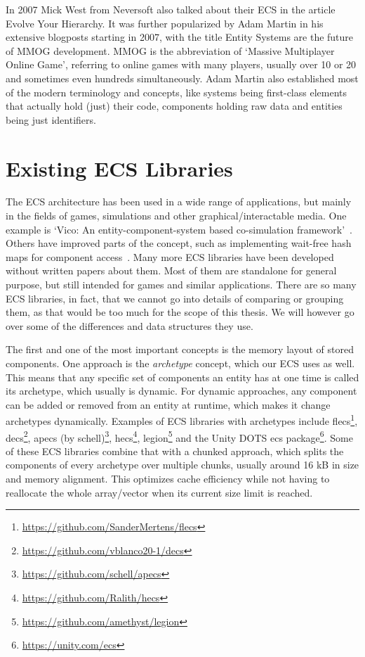 In 2007 Mick West from Neversoft also talked about their ECS in the article \textsf{Evolve Your Hierarchy}\cite{evolvehierarchy}. It was further popularized by Adam Martin in his extensive blogposts starting in 2007, with the title \textsf{Entity Systems are the future of MMOG development}\cite{entitysystems}. MMOG is the abbreviation of `Massive Multiplayer Online Game', referring to online games with many players, usually over 10 or 20 and sometimes even hundreds simultaneously. Adam Martin also established most of the modern terminology and concepts, like systems being first-class elements that actually hold (just) their code, components holding raw data and entities being just identifiers.

\section{Existing ECS Libraries}\label{sec:existingecs}

The ECS architecture has been used in a wide range of applications, but mainly in the fields of games, simulations and other graphical/interactable media. One example is `Vico: An entity-component-system based co-simulation framework'~\cite{hatledal2021vico}. Others have improved parts of the concept, such as implementing wait-free hash maps for component access~\cite{lange2016wait}. Many more ECS libraries have been developed without written papers about them. Most of them are standalone for general purpose, but still intended for games and similar applications. There are so many ECS libraries, in fact, that we cannot go into details of comparing or grouping them, as that would be too much for the scope of this thesis. We will however go over some of the differences and data structures they use.

The first and one of the most important concepts is the memory layout of stored components. One approach is the \textit{archetype} concept, which our ECS uses as well. This means that any specific set of components an entity has at one time is called its archetype, which usually is dynamic. For dynamic approaches, any component can be added or removed from an entity at runtime, which makes it change archetypes dynamically. Examples of ECS libraries with archetypes include \textsf{flecs}\footnote{\url{https://github.com/SanderMertens/flecs}}, \textsf{decs}\footnote{\url{https://github.com/vblanco20-1/decs}}, \textsf{apecs} (by schell)\footnote{\url{https://github.com/schell/apecs}}, \textsf{hecs}\footnote{\url{https://github.com/Ralith/hecs}}, \textsf{legion}\footnote{\url{https://github.com/amethyst/legion}} and the Unity DOTS ecs package\footnote{\url{https://unity.com/ecs}}. Some of these ECS libraries combine that with a chunked approach, which splits the components of every archetype over multiple chunks, usually around 16 kB in size and memory alignment. This optimizes cache efficiency while not having to reallocate the whole array/vector when its current size limit is reached.

